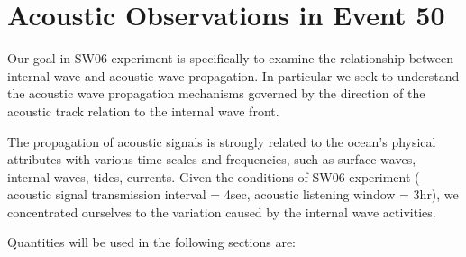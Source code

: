 
\chapter{Acoustic Observations in Event 50}



Our goal in SW06 experiment is specifically to examine the relationship between internal wave and acoustic wave propagation. In particular we seek to understand the acoustic wave propagation mechanisms governed by the direction of the acoustic track relation to the internal wave front. 


The propagation of acoustic signals is strongly related to the ocean's physical attributes with various time scales and frequencies, such as surface waves, internal waves, tides, currents. Given the conditions of SW06 experiment  ( acoustic signal transmission interval = 4sec, acoustic listening window = 3hr), we concentrated ourselves to the variation caused by the internal wave activities. 

Quantities will be used in the following sections are:

